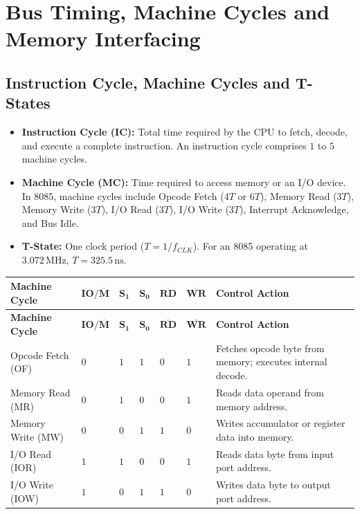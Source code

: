 \documentclass[12pt,a4paper]{article}
\begin{document}
\section{Bus Timing, Machine Cycles and Memory Interfacing}

\subsection{Instruction Cycle, Machine Cycles and T-States}
\begin{itemize}[leftmargin=*]
  \item \textbf{Instruction Cycle (IC):} Total time required by the CPU to fetch, decode, and execute a complete instruction. An instruction cycle comprises $1$ to $5$ machine cycles.
  \item \textbf{Machine Cycle (MC):} Time required to access memory or an I/O device. In 8085, machine cycles include Opcode Fetch ($4T$ or $6T$), Memory Read ($3T$), Memory Write ($3T$), I/O Read ($3T$), I/O Write ($3T$), Interrupt Acknowledge, and Bus Idle.
  \item \textbf{T-State:} One clock period ($T = 1/f_{CLK}$). For an 8085 operating at $3.072\,\mathrm{MHz}$, $T = 325.5\,\mathrm{ns}$.
\end{itemize}

\par\vspace{6pt}\noindent
\begingroup
\setlength{\extrarowheight}{2.5pt}
\begingroup
\setlength{\LTleft}{0pt}
\setlength{\LTright}{0pt}
\begin{longtable}{|B{3.2cm}|B{1.6cm}|B{1.3cm}|B{1.3cm}|B{1.4cm}|B{1.4cm}|>{\small\raggedright\arraybackslash}m{\dimexpr(\linewidth-3.2cm-1.6cm-1.3cm-1.3cm-1.4cm-1.4cm-14\arrayrulewidth)/1\relax}|}
\hline
\textbf{Machine Cycle} & $\mathbf{IO/\overline{M}}$ & $\mathbf{S_1}$ & $\mathbf{S_0}$ & $\mathbf{\overline{RD}}$ & $\mathbf{\overline{WR}}$ & \textbf{Control Action} \\ \hline
\endfirsthead
\hline
\textbf{Machine Cycle} & $\mathbf{IO/\overline{M}}$ & $\mathbf{S_1}$ & $\mathbf{S_0}$ & $\mathbf{\overline{RD}}$ & $\mathbf{\overline{WR}}$ & \textbf{Control Action} \\ \hline
\endhead
Opcode Fetch (OF) & $0$ & $1$ & $1$ & $0$ & $1$ & Fetches opcode byte from memory; executes internal decode. \\ \hline
Memory Read (MR) & $0$ & $1$ & $0$ & $0$ & $1$ & Reads data operand from memory address. \\ \hline
Memory Write (MW) & $0$ & $0$ & $1$ & $1$ & $0$ & Writes accumulator or register data into memory. \\ \hline
I/O Read (IOR) & $1$ & $1$ & $0$ & $0$ & $1$ & Reads data byte from input port address. \\ \hline
I/O Write (IOW) & $1$ & $0$ & $1$ & $1$ & $0$ & Writes data byte to output port address. \\ \hline
\end{longtable}
\endgroup\par
\endgroup
\end{document}
